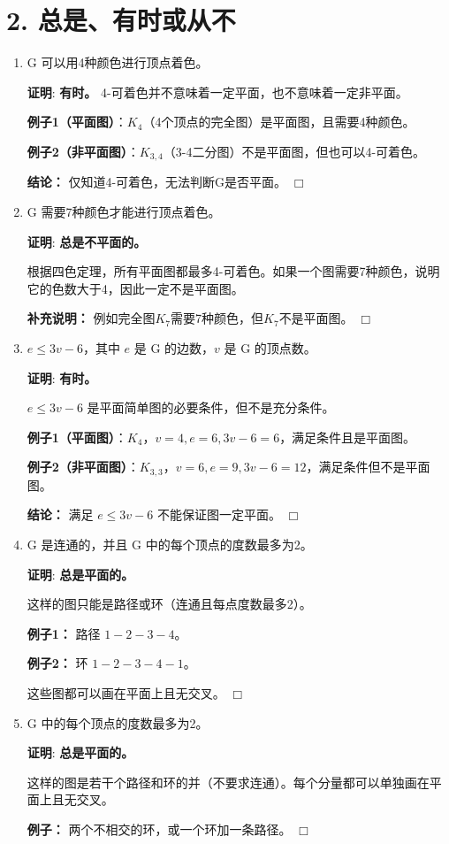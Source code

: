 \documentclass[11pt]{article}
\newenvironment{qparts}{\begin{enumerate}[{(}a{)}]}{\end{enumerate}}
\def\endproofmark{$\Box$}
\newenvironment{proof}{\par{\bf 证明}:}{\endproofmark\smallskip}
\begin{document}

\section*{2. 总是、有时或从不}
\begin{qparts}
\item G 可以用4种颜色进行顶点着色。
\begin{proof}
\textbf{有时。} 4-可着色并不意味着一定平面，也不意味着一定非平面。

\textbf{例子1（平面图）}：$K_4$（4个顶点的完全图）是平面图，且需要4种颜色。

\textbf{例子2（非平面图）}：$K_{3,4}$（3-4二分图）不是平面图，但也可以4-可着色。

\textbf{结论：} 仅知道4-可着色，无法判断G是否平面。
\end{proof}

\item G 需要7种颜色才能进行顶点着色。
\begin{proof}
\textbf{总是不平面的。}

根据四色定理，所有平面图都最多4-可着色。如果一个图需要7种颜色，说明它的色数大于4，因此一定不是平面图。

\textbf{补充说明：} 例如完全图$K_7$需要7种颜色，但$K_7$不是平面图。
\end{proof}

\item $e \le 3v-6$，其中 $e$ 是 G 的边数，$v$ 是 G 的顶点数。
\begin{proof}
\textbf{有时。}

$e \le 3v-6$ 是平面简单图的必要条件，但不是充分条件。

\textbf{例子1（平面图）}：$K_4$，$v=4, e=6, 3v-6=6$，满足条件且是平面图。

\textbf{例子2（非平面图）}：$K_{3,3}$，$v=6, e=9, 3v-6=12$，满足条件但不是平面图。

\textbf{结论：} 满足 $e \le 3v-6$ 不能保证图一定平面。
\end{proof}

\item G 是连通的，并且 G 中的每个顶点的度数最多为2。
\begin{proof}
\textbf{总是平面的。}

这样的图只能是路径或环（连通且每点度数最多2）。

\textbf{例子1：} 路径 $1-2-3-4$。

\textbf{例子2：} 环 $1-2-3-4-1$。

这些图都可以画在平面上且无交叉。
\end{proof}

\item G 中的每个顶点的度数最多为2。
\begin{proof}
\textbf{总是平面的。}

这样的图是若干个路径和环的并（不要求连通）。每个分量都可以单独画在平面上且无交叉。

\textbf{例子：} 两个不相交的环，或一个环加一条路径。
\end{proof}
\end{qparts}
\end{document}

